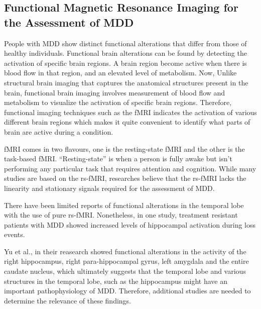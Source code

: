 \documentclass{article}
\begin{document}

\subsection{Functional Magnetic Resonance Imaging for the Assessment
of MDD}

People with MDD show distinct functional alterations that differ from
those of healthy individuals. Functional brain alterations can be
found by detecting the activation of specific brain regions. A brain
region become active when there is blood flow in that region, and an
elevated level of metabolism. Now, Unlike structural brain imaging
that captures the anatomical structures present in the brain,
functional brain imaging involves measurement of blood flow and
metabolism to visualize the activation of specific brain regions.
Therefore, functional imaging techniques such as the fMRI indicates
the activation of various different brain regions which makes it quite
convenient to identify what parts of brain are active during a
condition.

fMRI comes in two flavours, one is the resting-state fMRI and the
other is the task-based fMRI. ``Resting-state'' is when a person is
fully awake but isn't performing any particular task that requires
attention and cognition. While many studies are based on the rs-fMRI,
researches believe that the rs-fMRI lacks the linearity and stationary
signals required for the assessment of MDD.


There have been limited reports of functional alterations in the
temporal lobe with the use of pure rs-fMRI. Nonetheless, in one study,
treatment resistant patients with MDD showed increased levels of
hippocampal activation during loss events.

Yu et al., in their reasearch showed functional alterations in the
activity of the right hippocampus, right para-hippocampal gyrus, left
amygdala and the entire caudate nucleus, which ultimately suggests
that the temporal lobe and various structures in the temporal lobe,
such as the hippocampus might have an important pathophysiology of
MDD.  Therefore, additional studies are needed to determine the
relevance of these findings.
\end{document}

